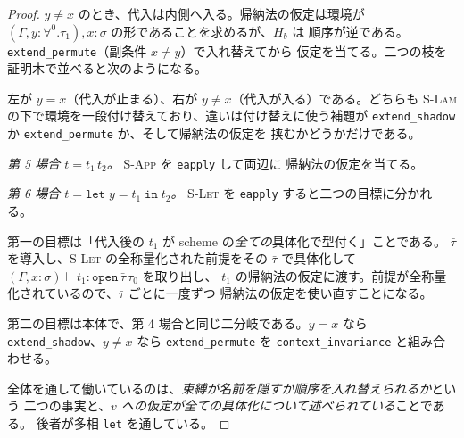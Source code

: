 \documentclass[11pt,a4paper]{ltjsarticle}
\newcommand{\subst}[3]{#1[#2 := #3]}
\begin{document}
\begin{proof}
$y \neq x$ のとき、代入は内側へ入る。帰納法の仮定は環境が
$(\Gamma, y{:}\forall^{0}.\tau_1), x{:}\sigma$ の形であることを求めるが、$H_b$ は
順序が逆である。\texttt{extend\_permute}（副条件 $x \neq y$）で入れ替えてから
仮定を当てる。二つの枝を証明木で並べると次のようになる。


左が $y = x$（代入が止まる）、右が $y \neq x$（代入が入る）である。どちらも
\textsc{S-Lam} の下で環境を一段付け替えており、違いは付け替えに使う補題が
\texttt{extend\_shadow} か \texttt{extend\_permute} か、そして帰納法の仮定を
挟むかどうかだけである。

\medskip
\emph{第 5 場合 $t = t_1\,t_2$。} \textsc{S-App} を \texttt{eapply} して両辺に
帰納法の仮定を当てる。

\medskip
\emph{第 6 場合 $t = \mathtt{let}\;y = t_1\;\mathtt{in}\;t_2$。} \textsc{S-Let} を
\texttt{eapply} すると二つの目標に分かれる。

第一の目標は「代入後の $t_1$ が scheme の\emph{全ての}具体化で型付く」ことである。
$\bar\tau$ を導入し、\textsc{S-Let} の全称量化された前提をその $\bar\tau$ で具体化して
$(\Gamma, x{:}\sigma) \vdash t_1 : \mathtt{open}\,\bar\tau\,\tau_0$ を取り出し、
$t_1$ の帰納法の仮定に渡す。前提が全称量化されているので、$\bar\tau$ ごとに一度ずつ
帰納法の仮定を使い直すことになる。

第二の目標は本体で、第 4 場合と同じ二分岐である。$y = x$ なら
\texttt{extend\_shadow}、$y \neq x$ なら \texttt{extend\_permute} を
\texttt{context\_invariance} と組み合わせる。

\medskip
全体を通して働いているのは、\emph{束縛が名前を隠すか順序を入れ替えられるか}という
二つの事実と、\emph{$v$ への仮定が全ての具体化について述べられている}ことである。
後者が多相 \texttt{let} を通している。
\end{proof}
\end{document}
